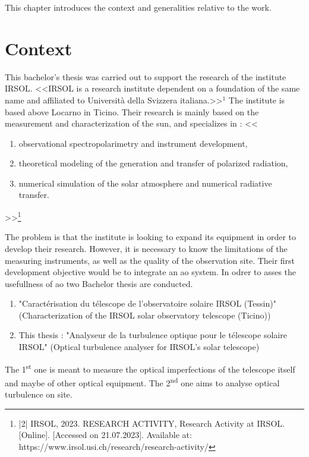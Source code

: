 This chapter introduces the context and generalities relative to the work.

\section{Context}
This bachelor's thesis was carried out to support the research of the institute \Gls{IRSOL}. \newline
<<\Gls{IRSOL} is a research institute dependent on a foundation of the same name and affiliated to Università della Svizzera italiana.>>$^1$
The institute is based above Locarno in Ticino. \newline
Their research is mainly based on the measurement and characterization of the sun, and specializes in :
<<
\begin{enumerate}
    \item observational spectropolarimetry and instrument development,
    \item theoretical modeling of the generation and transfer of polarized radiation,
    \item numerical simulation of the solar atmosphere and numerical radiative transfer.
\end{enumerate}>>\footnote{|2| \Gls{IRSOL}, 2023. RESEARCH ACTIVITY, Research Activity at \Gls{IRSOL}. [Online]. [Accessed on 21.07.2023]. Available at: https://www.irsol.usi.ch/research/research-activity/}

The problem is that the institute is looking to expand its equipment in order to develop their research.
However, it is necessary to know the limitations of the measuring instruments, as well as the quality of the observation site.
Their first development objective would be to integrate an \acrfull{ao} system.
\newline
In odrer to asses the usefullness of \Gls{ao} two Bachelor thesis are conducted.
\begin{enumerate}
    \item "Caractérisation du télescope de l'observatoire solaire \Gls{IRSOL} (Tessin)" (Characterization of the \Gls{IRSOL} solar observatory telescope (Ticino))
    \item This thesis : "Analyseur de la turbulence optique pour le télescope solaire \Gls{IRSOL}" (Optical turbulence analyser for \Gls{IRSOL}'s solar telescope)
\end{enumerate}
The 1\textsuperscript{st} one is meant to measure the optical imperfections of the telescope itself and maybe of other optical equipment.
The 2\textsuperscript{nd} one aims to analyse optical turbulence on site.


